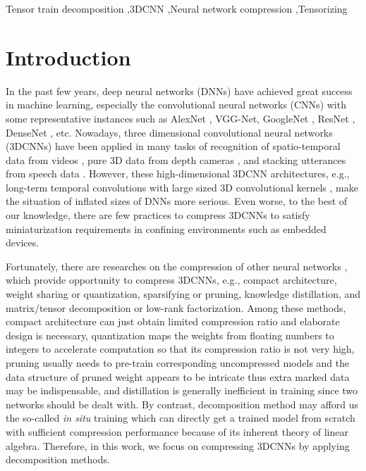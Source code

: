 \documentclass[a4paper,fleqn]{cas-dc}
\begin{document}
\begin{keywords}
Tensor train decomposition \sep 3DCNN \sep Neural network compression \sep Tensorizing
\end{keywords}


\maketitle



\section{Introduction}\label{sec:Intro}

In the past few years, deep neural networks (DNNs) \citep{LeCun_2015_DNN} have achieved great success in machine learning, especially the convolutional neural networks (CNNs) with some representative instances such as AlexNet \citep{Krizhevsky_2012_AlexNet}, VGG-Net\citep{Simonyan_2015_VGG}, Goo\-gleNet \citep{Szegedy_2015_GoogleNet}, ResNet \citep{He_2016_ResNet}, Dense\-Net \citep{Huang_2017_DenseNet}, etc. Nowadays, three dimensional convolutional neural networks (3DCNNs) \citep{Ji_Shuiwang_2013_3DCNN,Tran_2015_3DCNN} have been applied in many tasks of recognition of spatio-temporal data from videos \citep{Zhang_2017_3DCNNLSTM,Zhu_2017_3DCNN_LSTM,Molchanov_2015_3DCNN_1,Molchanov_2015_3DCNN_2,Molchanov_2016_3DCNN_3,Camgoz_2016_3DCNN,Varol_2018_LongTerm3DCNN,Hara_2018_Res3DCNN}, pure 3D data from depth cameras \citep{Ge_2017_PointsCloud3DCNN}, and stacking utterances from speech data \citep{Torfi_2018_Speak3DCNN}. However, these high-dimensional 3DCNN architectures, e.g., long-term temporal convolutions with large sized 3D convolutional kernels \citep{Varol_2018_LongTerm3DCNN}, make the situation of inflated sizes of DNNs \citep{Cheng_2018_CompressSurvey} more serious. Even worse, to the best of our knowledge, there are few practices to compress 3DCNNs to satisfy miniaturization requirements in confining environments such as embedded devices.

Fortunately, there are researches on the compression of other neural networks \citep{Cheng_2018_CompressSurvey}, which provide opportunity to compress 3DCNNs, e.g., compact architecture, weight sharing or quantization, sparsifying or pruning, knowledge distillation, and matrix/tensor decomposition or low-rank factorization. Among these methods, compact architecture can just obtain limited compression ratio and elaborate design is necessary, quantization maps the weights from floating numbers to integers to accelerate computation so that its compression ratio is not very high, pruning usually needs to pre-train corresponding uncompressed models and the data structure of pruned weight appears to be intricate thus extra marked data may be indispensable, and distillation is generally inefficient in training since two networks should be dealt with. By contrast, decomposition method may afford us the so-called \emph{in situ} training \citep{Alibart_2013_ExInSitu} which can directly get a trained model from scratch with sufficient compression performance because of its inherent theory of linear algebra. Therefore, in this work, we focus on compressing 3DCNNs by applying decomposition methods.
\end{document}
